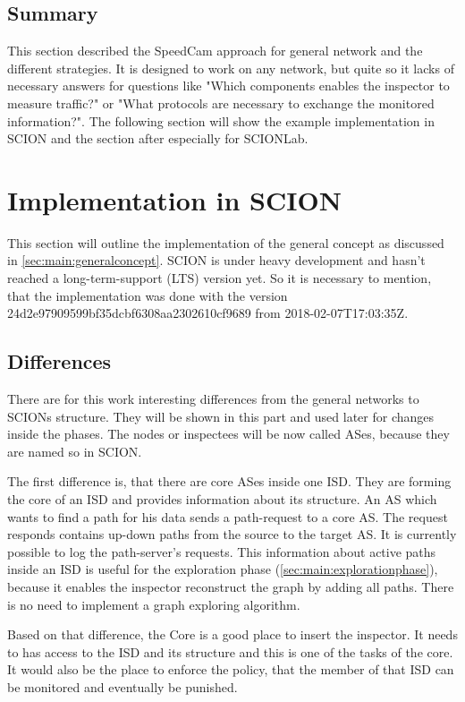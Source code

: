\documentclass[thesis.tex]{subfiles}
\begin{document}
\subsection{Summary}
This section described the SpeedCam approach for general network and the different strategies. It is designed to work on any network, but quite so it lacks of necessary answers for questions like "Which components enables the inspector to measure traffic?" or "What protocols are necessary to exchange the monitored information?". The following section will show the example implementation in SCION and the section after especially for SCIONLab.

\section{Implementation in SCION} \label{sec:main:scionimpl}

This section will outline the implementation of the general concept as discussed in \autoref{sec:main:generalconcept}. SCION is under heavy development and hasn't reached a long-term-support (LTS) version yet. So it is necessary to mention, that the implementation was done with the version  24d2e97909599bf35dcbf6308aa2302610cf9689 from 2018-02-07T17:03:35Z. 

\subsection{Differences}

There are for this work interesting differences from the general networks to SCIONs structure. They will be shown in this part and used later for changes inside the phases. The nodes or inspectees will be now called ASes, because they are named so in SCION.

The first difference is, that there are core ASes inside one ISD. They are forming the core of an ISD and provides information about its structure. An AS which wants to find a path for his data sends a path-request to a core AS. The request responds contains up-down paths  from the source to the target AS. It is currently possible to log the path-server's requests. This information about active paths inside an ISD is useful for the exploration phase (\autoref{sec:main:explorationphase}), because it enables the inspector reconstruct the graph by adding all paths. There is no need to implement a graph exploring algorithm.

Based on that difference, the Core is a good place to insert the inspector. It needs to has access to the ISD and its structure and this is one of the tasks of the core. It would also be the place to enforce the policy, that the member of that ISD can be monitored and eventually be punished. 
\end{document}
